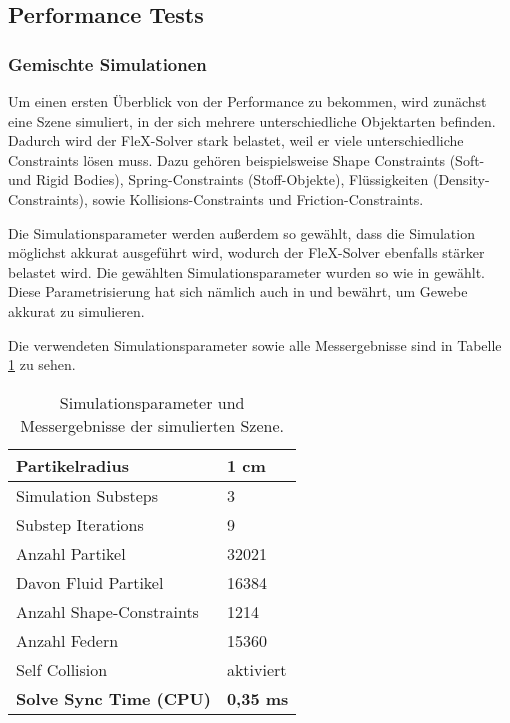 \subsection{Performance Tests}
\label{subsec_perf_tests}
\subsubsection{Gemischte Simulationen}

Um einen ersten Überblick von der Performance zu bekommen, wird zunächst eine Szene simuliert, in der sich mehrere unterschiedliche Objektarten befinden. Dadurch wird der FleX-Solver stark belastet, weil er viele unterschiedliche Constraints lösen muss. Dazu gehören beispielsweise Shape Constraints (Soft- und Rigid Bodies), Spring-Constraints (Stoff-Objekte), Flüssigkeiten (Density-Constraints), sowie Kollisions-Constraints und Friction-Constraints.



Die Simulationsparameter werden außerdem so gewählt, dass die Simulation möglichst akkurat ausgeführt wird, wodurch der FleX-Solver ebenfalls stärker belastet wird. Die gewählten Simulationsparameter wurden so wie in \cite{BreastBiopsy} gewählt. Diese Parametrisierung hat sich nämlich auch in \cite{PBDKidney} und \newline \cite{VRSim20} bewährt, um Gewebe akkurat zu simulieren.

Die verwendeten Simulationsparameter sowie alle Messergebnisse sind in Tabelle \ref{table_mixed_sim} zu sehen.

\begin{table}[hbt!]
\centering
\caption{Simulationsparameter und Messergebnisse der simulierten Szene.}
\label{table_mixed_sim}
\begin{tabular}{l|l}
 \hline
Partikelradius & 1 cm  \\ \hline
Simulation Substeps & 3      \\ \hline
Substep Iterations & 9            \\ \hline
Anzahl Partikel & 32021            \\ \hline
Davon Fluid Partikel & 16384	\\ \hline
Anzahl Shape-Constraints & 1214		\\ \hline
Anzahl Federn & 15360 		\\ \hline
Self Collision & aktiviert \\ \hline%
\textbf{Solve Sync Time (CPU)} & \textbf{0,35 ms}
\end{tabular}
\end{table}

